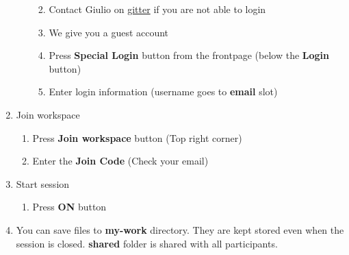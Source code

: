 \documentclass[
  oneside]{book}
\providecommand{\tightlist}{%
  \setlength{\itemsep}{0pt}\setlength{\parskip}{0pt}}
\begin{document}
\begin{enumerate}
\begin{enumerate}
    \begin{enumerate}
    \def\labelenumiii{\arabic{enumiii}.}
    \tightlist
    \item
      Contact Giulio on \href{https://app.gitter.im/\#/room/\#microbiome_miaverse:gitter.im}{gitter} if you are not able to login
    \item
      We give you a guest account
    \item
      Press \textbf{Special Login} button from the frontpage (below the \textbf{Login} button)
    \item
      Enter login information (username goes to \textbf{email} slot)
    \end{enumerate}
  \end{enumerate}
\item
  Join workspace

  \begin{enumerate}
  \def\labelenumii{\alph{enumii}.}
  \tightlist
  \item
    Press \textbf{Join workspace} button (Top right corner)
  \item
    Enter the \textbf{Join Code} (Check your email)
  \end{enumerate}
\item
  Start session

  \begin{enumerate}
  \def\labelenumii{\alph{enumii}.}
  \tightlist
  \item
    Press \textbf{ON} button
  \end{enumerate}
\item
  You can save files to \textbf{my-work} directory. They are kept stored even when the session is closed. \textbf{shared} folder is shared with all participants.
\end{enumerate}

  
\end{document}
